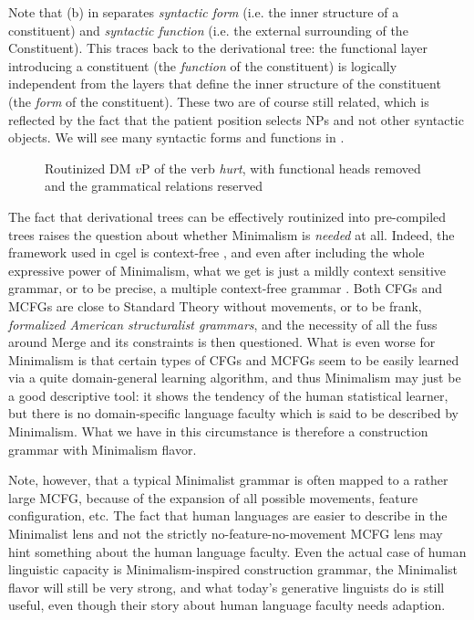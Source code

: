 \documentclass[../main.tex]{subfiles}
\begin{document}
Note that (b) in  separates 
\emph{syntactic form} (i.e. the inner structure of a constituent) 
and \emph{syntactic function} (i.e. the external surrounding of the Constituent).
This traces back to the derivational tree: 
the functional layer introducing a constituent (the \emph{function} of the constituent) 
is logically independent from the layers 
that define the inner structure of the constituent (the \emph{form} of the constituent).
These two are of course still related, which is reflected by the fact that 
the patient position selects NPs and not other syntactic objects.
We will see many syntactic forms and functions in .

\begin{figure}
    \centering
    

    \caption{Routinized DM $v$P of the verb \emph{hurt}, with functional heads removed and the grammatical relations reserved}
    \label{fig:hurt-constituent-tree}
\end{figure}

The fact that derivational trees can be effectively routinized into pre-compiled trees 
raises the question about whether Minimalism is \emph{needed} at all.
Indeed, the framework used in \ac{cgel} is context-free \citep{pullum2008expressive}, 
and even after including the whole expressive power of Minimalism, 
what we get is just a mildly context sensitive grammar, or to be precise, 
a multiple context-free grammar \citep{clark2014introduction}.
Both CFGs and MCFGs are close to Standard Theory without movements, 
or to be frank, \emph{formalized American structuralist grammars},
and the necessity of all the fuss around Merge and its constraints is then questioned.
What is even worse for Minimalism is that certain types of CFGs and MCFGs 
seem to be easily learned via a quite domain-general learning algorithm,
and thus Minimalism may just be a good descriptive tool:
it shows the tendency of the human statistical learner,
but there is no domain-specific language faculty 
which is said to be described by Minimalism.
What we have in this circumstance is therefore a construction grammar with Minimalism flavor.

Note, however, that a typical Minimalist grammar is often mapped to a rather large MCFG, 
because of the expansion of all possible movements, feature configuration, etc. 
The fact that human languages are easier to describe in the Minimalist lens 
and not the strictly no-feature-no-movement MCFG lens may hint something about the human language faculty.
Even the actual case of human linguistic capacity is Minimalism-inspired construction grammar, 
the Minimalist flavor will still be very strong,
and what today's generative linguists do is still useful, 
even though their story about human language faculty needs adaption.
\end{document}
